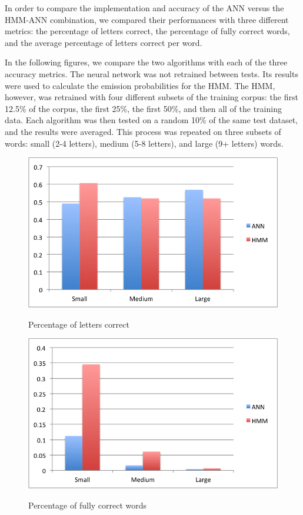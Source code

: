 \documentclass[11pt,a4paper,twocolumn]{article}
\begin{document}
In order to compare the implementation and accuracy of the ANN versus the
HMM-ANN combination, we compared their performances with three different
metrics: the percentage of letters correct, the
percentage of fully correct words, and the average percentage of letters correct per word.

In the following figures, we compare the two algorithms with each of the three accuracy metrics. The
neural network was not retrained between tests. Its results were used to calculate the emission
probabilities for the HMM\@. The HMM, however, was retrained with four different subsets of the
training corpus: the first 12.5\% of the corpus, the first 25\%, the first 50\%, and then all of the
training data. Each algorithm was then tested on a random 10\% of the same test dataset, and the
results were averaged. This process was repeated on three subsets of words: small (2-4 letters),
medium (5-8 letters), and large (9+ letters) words.

\begin{figure}[h]
\centering
\caption{Percentage of letters correct}
\includegraphics[scale=0.55]{img/lettersCorrect.png}
\label{fig:lettersCorrect}
\end{figure}

\begin{figure}[h]
\centering
\caption{Percentage of fully correct words}
\includegraphics[scale=0.55]{img/wordsCorrect.png}
\label{fig:wordsCorrect}
\end{figure}
\end{document}

